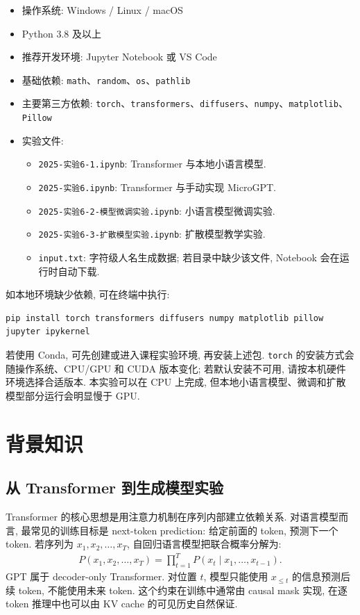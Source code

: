 \documentclass{../../nndlcourse}
\begin{document}
\begin{itemize}
    \item 操作系统: Windows / Linux / macOS
    \item Python 3.8 及以上
    \item 推荐开发环境: Jupyter Notebook 或 VS Code
    \item 基础依赖: \texttt{math}、\texttt{random}、\texttt{os}、\texttt{pathlib}
    \item 主要第三方依赖: \texttt{torch}、\texttt{transformers}、\texttt{diffusers}、\texttt{numpy}、\texttt{matplotlib}、\texttt{Pillow}
    \item 实验文件:
    \begin{itemize}
        \item \texttt{2025-实验6-1.ipynb}: Transformer 与本地小语言模型.
        \item \texttt{2025-实验6.ipynb}: Transformer 与手动实现 MicroGPT.
        \item \texttt{2025-实验6-2-模型微调实验.ipynb}: 小语言模型微调实验.
        \item \texttt{2025-实验6-3-扩散模型实验.ipynb}: 扩散模型教学实验.
        \item \texttt{input.txt}: 字符级人名生成数据; 若目录中缺少该文件, Notebook 会在运行时自动下载.
    \end{itemize}
\end{itemize}

如本地环境缺少依赖, 可在终端中执行:
\begin{verbatim}
pip install torch transformers diffusers numpy matplotlib pillow jupyter ipykernel
\end{verbatim}
若使用 Conda, 可先创建或进入课程实验环境, 再安装上述包. \texttt{torch} 的安装方式会随操作系统、CPU/GPU 和 CUDA 版本变化; 若默认安装不可用, 请按本机硬件环境选择合适版本. 本实验可以在 CPU 上完成, 但本地小语言模型、微调和扩散模型部分运行会明显慢于 GPU.


\section{背景知识}

\subsection{从 Transformer 到生成模型实验}

Transformer 的核心思想是用注意力机制在序列内部建立依赖关系. 对语言模型而言, 最常见的训练目标是 next-token prediction: 给定前面的 token, 预测下一个 token. 若序列为 $x_1,x_2,\ldots,x_T$, 自回归语言模型把联合概率分解为:
\begin{align}
    P(x_1,x_2,\ldots,x_T)
    =
    \prod_{t=1}^{T}P(x_t \mid x_1,\ldots,x_{t-1}).
\end{align}
GPT 属于 decoder-only Transformer. 对位置 $t$, 模型只能使用 $x_{\le t}$ 的信息预测后续 token, 不能使用未来 token. 这个约束在训练中通常由 causal mask 实现, 在逐 token 推理中也可以由 KV cache 的可见历史自然保证.
\end{document}

